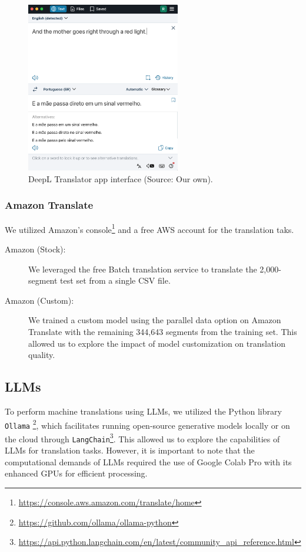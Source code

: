 \begin{figure}[htb]
\centering
\includegraphics[width=0.6\textwidth]{textual/Figuras/deepl-app.png}
\caption{DeepL Translator app interface (Source: Our own).}
\label{fig: deepl-app}
\end{figure}

\subsubsection{Amazon Translate}

We utilized Amazon's  console\footnote{\href{https://console.aws.amazon.com/translate/home}{https://console.aws.amazon.com/translate/home}} and a free AWS account for the translation taks.

\begin{description}
    \item[\hspace{=2em}Amazon (Stock):] We leveraged the free Batch translation service to translate the 2,000-segment test set from a single CSV file.
    \item[\hspace{=2em}Amazon (Custom):] We trained a custom model using the parallel data option on Amazon Translate with the remaining 344,643 segments from the training set. This allowed us to explore the impact of model customization on translation quality.
\end{description}


\subsection{LLMs}

To perform machine translations using LLMs, we utilized the Python library \texttt{Ollama} \footnote{\href{https://github.com/ollama/ollama-python}{https://github.com/ollama/ollama-python}}, which facilitates running open-source generative models locally or on the cloud through \texttt{LangChain}\footnote{\href{https://api.python.langchain.com/en/latest/community_api_reference.html}{https://api.python.langchain.com/en/latest/community\_api\_reference.html}}. This allowed us to explore the capabilities of LLMs for translation tasks. However, it is important to note that the computational demands of LLMs required the use of Google Colab Pro with its enhanced GPUs for efficient processing.

